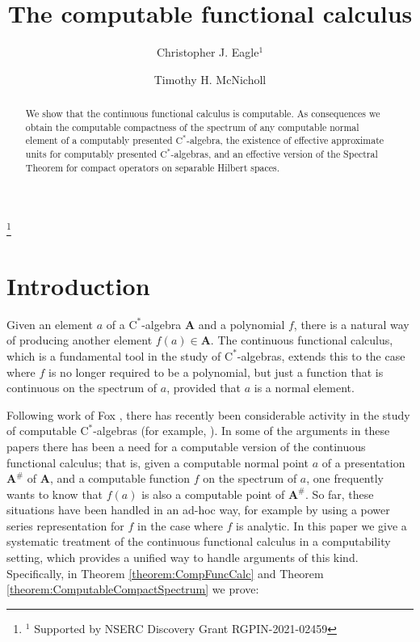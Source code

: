 \documentclass{amsart}
\newcommand{\boldA}{\mathbf{A}}
\newcommand{\cstar}{$\mathrm{C}^*$}
\theoremstyle{plain}
\theoremstyle{definition}
\numberwithin{equation}{section}
\begin{document}
\title{The computable functional calculus}
\author[C. J. Eagle]{Christopher J. Eagle${}^1$} 
\address[C. J. Eagle]
{Department of Mathematics and Statistics, University of Victoria. PO BOX 1700 STN CSC, Victoria, British Columbia, Canada. V8W 2Y2}%
\thanks{${}^1$ Supported by NSERC Discovery Grant RGPIN-2021-02459}

\author[T. H. McNicholl]{Timothy H. McNicholl}
\address[T. H. McNicholl]{Iowa State University}

\begin{abstract}
We show that the continuous functional calculus is computable.  As consequences we obtain the computable compactness of the spectrum of any computable normal element of a computably presented \cstar-algebra, the existence of effective approximate units for computably presented \cstar-algebras, and an effective version of the Spectral Theorem for compact operators on separable Hilbert spaces.
\end{abstract}
\maketitle

\tableofcontents

\section{Introduction}\label{sec:Intro}
Given an element $a$ of a \cstar-algebra $\boldA$ and a polynomial $f$, there is a natural way of producing another element $f(a) \in \boldA$.  The continuous functional calculus, which is a fundamental tool in the study of \cstar-algebras, extends this to the case where $f$ is no longer required to be a polynomial, but just a function that is continuous on the spectrum of $a$, provided that $a$ is a normal element.

Following work of Fox \cite{fox2022computable}, there has recently been considerable activity in the study of computable \cstar-algebras (for example, \cite{Gelfand, AFPaper, UHFPaper, NonComputabilityPaper, FoxGoldbringHart.2024, Goldbring.2026, McNicholl.2025}).  In some of the arguments in these papers there has been a need for a computable version of the continuous functional calculus; that is, given a computable normal point $a$ of a presentation $\boldA^\#$ of $\boldA$, and a computable function $f$ on the spectrum of $a$, one frequently wants to know that $f(a)$ is also a computable point of $\boldA^\#$.  So far, these situations have been handled in an ad-hoc way, for example by using a power series representation for $f$ in the case where $f$ is analytic.  In this paper we give a systematic treatment of the continuous functional calculus in a computability setting, which provides a unified way to handle arguments of this kind.  Specifically, in Theorem \ref{theorem:CompFuncCalc} and Theorem \ref{theorem:ComputableCompactSpectrum} we prove:
\end{document}

